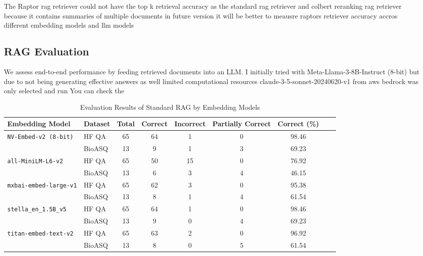 \documentclass{scrartcl}
\begin{document}
The Raptor rag retriever could not have the top k retrieval accuracy as the standard rag retriever  and colbert reranking rag retriever because it contains summaries of multiple documents in future version it will be better to meausre raptors retriever accuracy accros different embedding models and llm models

\subsection{RAG Evaluation}

We assess end-to-end performance by feeding retrieved documents into an LLM. I initially tried with Meta-Llama-3-8B-Instruct (8-bit) but due to not being generating effective answers as well limited computational resources claude-3-5-sonnet-20240620-v1 from aws bedrock was only selected and run You can check the 

\begin{table}[H]
\centering
\small
\begin{tabular}{l l c c c c c c c}
\hline

\textbf{Embedding Model} & \textbf{Dataset} & \textbf{Total} & \textbf{Correct} & \textbf{Incorrect} & \textbf{Partially Correct} & \textbf{Correct (\%)}  \\
\hline
\multirow{2}{*}{\texttt{NV-Embed-v2 (8-bit)}} 
 & HF QA  & 65 & 64 & 1 & 0 & 98.46 \\
 & BioASQ & 13 & 9  & 1 & 3 & 69.23 \\
\hline
\multirow{2}{*}{\texttt{all-MiniLM-L6-v2}} 
 & HF QA  & 65 & 50 & 15 & 0 & 76.92 \\
 & BioASQ & 13 & 6  & 3 & 4 & 46.15  \\
\hline
\multirow{2}{*}{\texttt{mxbai-embed-large-v1}} 
 & HF QA  & 65 & 62 & 3 & 0 & 95.38 \\
 & BioASQ & 13 & 8  & 1 & 4 & 61.54 \\
\hline
\multirow{2}{*}{\texttt{stella\_en\_1.5B\_v5}} 
 & HF QA  & 65 & 64 & 1 & 0 & 98.46 \\
 & BioASQ & 13 & 9  & 0 & 4 & 69.23 \\
\hline
\multirow{2}{*}{\texttt{titan-embed-text-v2}} 
 & HF QA  & 65 & 63 & 2 & 0 & 96.92 \\
 & BioASQ & 13 & 8  & 0 & 5 & 61.54\\
\hline
\end{tabular}
\caption{Evaluation Results of Standard RAG by Embedding Models}
\end{table}
\end{document}
